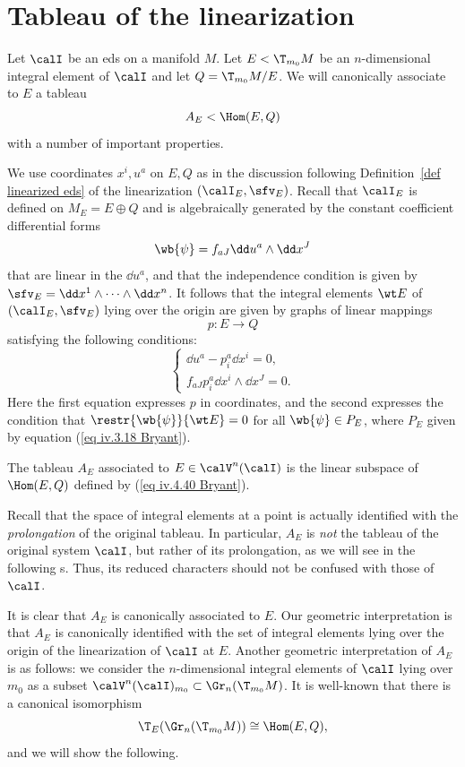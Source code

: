 \section{Tableau of the linearization}\label{sec: tableau of linearized eds}

Let $\calI$ be an \gls{eds} on a manifold $M$. Let $E<\T_{m_0}M$ be an $n$-dimensional integral element of $\calI$ and let $Q=\T_{m_0}M\slash E$. We will canonically associate to $E$ a tableau 
\[A_E<\Hom(E,Q)\]
with a number of important properties. 

We use coordinates $x^i,u^a$ on $E,Q$ as in the discussion following Definition~\ref{def linearized eds} of the linearization $(\calI_E,\sfv_E)$. Recall that $\calI_E$ is defined on $M_E=E\oplus Q$ and is algebraically generated by the constant coefficient differential forms 
\[\wb{\psi}=f_{a J}\dd u^a\wedge\dd x^J\]
that are linear in the $\dd u^a$, and that the independence condition is given by $\sfv_E=\dd x^1\wedge\cdots\wedge\dd x^n$. It follows that the integral elements $\wt E$ of $(\calI_E,\sfv_E)$ lying over the origin are given by graphs of linear mappings 
\[p:E\to Q\]
satisfying the following conditions:
\[\left\{
    \begin{array}{l}
        \dd u^a-p^a_i\dd x^i=0,\\
        f_{a J}p^a_i\dd x^i\wedge\dd x^J=0.
    \end{array}
\right.\label{eq iv.4.40 Bryant}\]
Here the first equation expresses $p$ in coordinates, and the second expresses the condition that $\restr{\wb{\psi}}{\wt E}=0$ for all $\wb{\psi}\in P_E$, where $P_E$ given by equation (\ref{eq iv.3.18 Bryant}).

\begin{defn}
    The tableau $A_E$ associated to $E\in\calV^n(\calI)$ is the linear subspace of $\Hom(E,Q)$ defined by (\ref{eq iv.4.40 Bryant}).
\end{defn}

\begin{rem}
    Recall that the space of integral elements at a point is actually identified with the \emph{prolongation} of the original tableau. In particular, $A_E$ is \emph{not} the tableau of the original system $\calI$, but rather of its prolongation, as we will see in the following \sect s. Thus, its reduced characters should not be confused with those of $\calI$.
\end{rem}

It is clear that $A_E$ is canonically associated to $E$. Our geometric interpretation is that $A_E$ is canonically identified with the set of integral elements lying over the origin of the linearization of $\calI$ at $E$. Another geometric interpretation of $A_E$ is as follows: we consider the $n$-dimensional integral elements of $\calI$ lying over $m_0$ as a subset $\calV^n(\calI)_{m_0}\subset \Gr_n(\T_{m_0} M)$. It is well-known that there is a canonical isomorphism 
\[\T_E(\Gr_n(\T_{m_0}M))\cong \Hom(E,Q),\]
and we will show the following.

